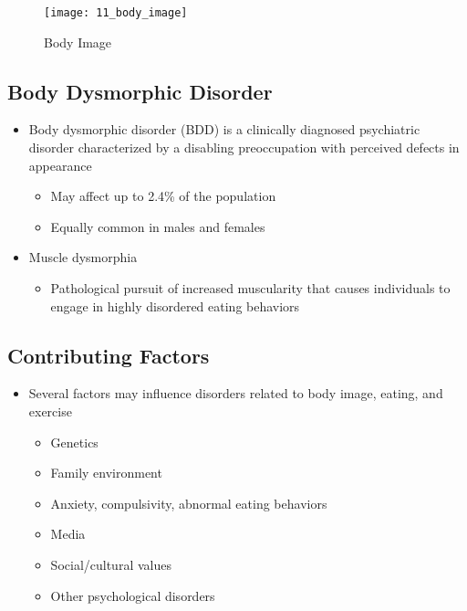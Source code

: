 \documentclass[title={Chapter 11}]{fdsn201notes}
\begin{document}
\begin{figure}[H]
	\centering
	\texttt{[image: 11\_body\_image]}
	\caption{Body Image}
	\label{fig:body-image}
\end{figure}

\subsection{Body Dysmorphic Disorder}\label{subsec:body-dysmorphic-disorder}
\begin{itemize}
	\item Body dysmorphic disorder (BDD) is a clinically diagnosed psychiatric disorder characterized by a disabling preoccupation with perceived defects in appearance
	\begin{itemize}
		\item May affect up to 2.4\% of the population
		\item Equally common in males and females
	\end{itemize}
	\item Muscle dysmorphia
	\begin{itemize}
		\item Pathological pursuit of increased muscularity that causes individuals to engage in highly disordered eating behaviors
	\end{itemize}
\end{itemize}

\subsection{Contributing Factors}\label{subsec:contributing-factors}
\begin{itemize}
	\item Several factors may influence disorders related to body image, eating, and exercise
	\begin{itemize}
		\item Genetics
		\item Family environment
		\item Anxiety, compulsivity, abnormal eating behaviors
		\item Media
		\item Social/cultural values
		\item Other psychological disorders
	\end{itemize}
\end{itemize}
\end{document}
